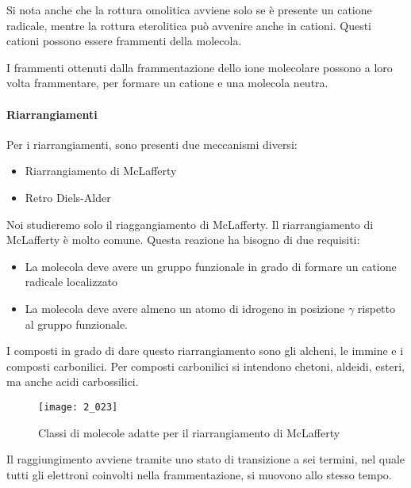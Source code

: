 Si nota anche che la rottura omolitica avviene solo se è presente un
catione radicale, mentre la rottura eterolitica può avvenire anche in
cationi. Questi cationi possono essere frammenti della molecola.

I frammenti ottenuti dalla frammentazione dello ione molecolare possono
a loro volta frammentare, per formare un catione e una molecola neutra.

\paragraph{Riarrangiamenti}

Per i riarrangiamenti, sono presenti due meccanismi diversi:
\begin{itemize}
  \item Riarrangiamento di McLafferty
  \item Retro Diels-Alder
\end{itemize}

Noi studieremo solo il riaggangiamento di McLafferty.
Il riarrangiamento di McLafferty è molto comune. Questa reazione ha
bisogno di due requisiti:
\begin{itemize}
  \item La molecola deve avere un gruppo funzionale
  in grado di formare un catione radicale localizzato
  \item La molecola deve
  avere almeno un atomo di idrogeno in posizione \(\gamma\) rispetto al
  gruppo funzionale.
\end{itemize}


I composti in grado di dare questo riarrangiamento sono gli
alcheni, le immine e i composti carbonilici. Per composti carbonilici si
intendono chetoni, aldeidi, esteri, ma anche acidi carbossilici.

\begin{figure}[hbtp]
  \texttt{[image: 2\_023]}
  \caption{Classi di molecole adatte per il riarrangiamento di McLafferty}
\end{figure} 

Il raggiungimento avviene tramite uno stato di transizione a sei
termini, nel quale tutti gli elettroni coinvolti nella frammentazione,
si muovono allo stesso tempo.

